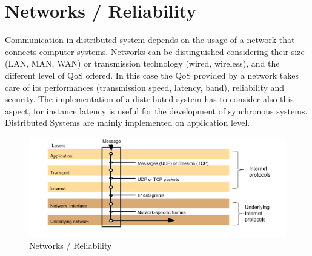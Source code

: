 \section{Networks / Reliability}
Communication in distributed system depends on the usage of a network that connects computer systems. Networks can be distinguished considering their size (LAN, MAN, WAN) or transmission technology (wired, wireless), and the different level of QoS offered. In this case the QoS provided by a network takes care of its performances (transmission speed, latency, band), reliability and security. The implementation of a distributed system has to consider also this aspect, for instance latency is useful for the development of synchronous systems. Distributed Systems are mainly implemented on application level.
\begin{figure}[!h]
            \centering
            \includegraphics[width=.7\linewidth]{images/clientServerCommunication/networkReliability.png}
            \caption{Networks / Reliability}
    \end{figure}